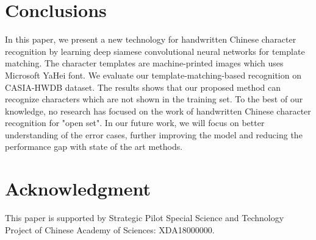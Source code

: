 \documentclass[conference]{IEEEtran}
\begin{document}
\section{Conclusions}
\label{Conclusions}
In this paper, we present a new technology for handwritten Chinese character recognition by learning deep siamese convolutional neural networks for template matching. The character templates are machine-printed images which uses Microsoft YaHei font. We evaluate our template-matching-based recognition on CASIA-HWDB dataset. The results shows that our proposed method can recognize characters which are not shown in the training set. To the best of our knowledge, no research has focused on the work of handwritten Chinese character recognition for "open set". In our future work, we will focus on better understanding of the error cases, further improving the model and reducing the performance gap with state of the art methods.






\section*{Acknowledgment}

This paper is supported by Strategic Pilot Special Science and Technology Project of Chinese Academy of Sciences: XDA18000000.
\end{document}
